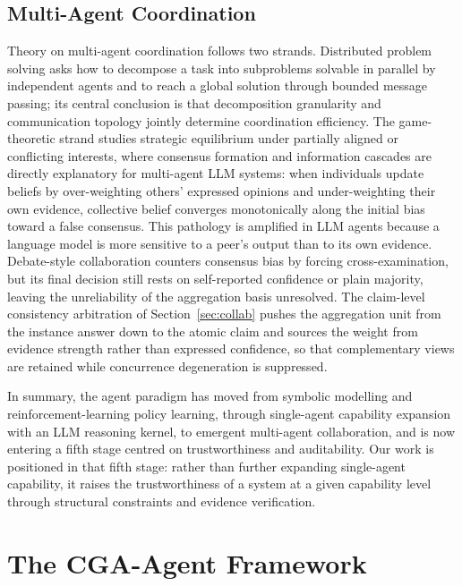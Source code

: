 \documentclass[journal,10pt,a4paper]{IEEEtran}
\begin{document}
\subsection{Multi-Agent Coordination}
Theory on multi-agent coordination follows two strands. Distributed problem solving asks how to decompose a task into subproblems solvable in parallel by independent agents and to reach a global solution through bounded message passing; its central conclusion is that decomposition granularity and communication topology jointly determine coordination efficiency. The game-theoretic strand studies strategic equilibrium under partially aligned or conflicting interests, where consensus formation and information cascades are directly explanatory for multi-agent LLM systems: when individuals update beliefs by over-weighting others' expressed opinions and under-weighting their own evidence, collective belief converges monotonically along the initial bias toward a false consensus. This pathology is amplified in LLM agents because a language model is more sensitive to a peer's output than to its own evidence. Debate-style collaboration counters consensus bias by forcing cross-examination, but its final decision still rests on self-reported confidence or plain majority, leaving the unreliability of the aggregation basis unresolved. The claim-level consistency arbitration of Section~\ref{sec:collab} pushes the aggregation unit from the instance answer down to the atomic claim and sources the weight from evidence strength rather than expressed confidence, so that complementary views are retained while concurrence degeneration is suppressed.

In summary, the agent paradigm has moved from symbolic modelling and reinforcement-learning policy learning, through single-agent capability expansion with an LLM reasoning kernel, to emergent multi-agent collaboration, and is now entering a fifth stage centred on trustworthiness and auditability. Our work is positioned in that fifth stage: rather than further expanding single-agent capability, it raises the trustworthiness of a system at a given capability level through structural constraints and evidence verification.

\section{The CGA-Agent Framework}
\label{sec:framework}
\end{document}
